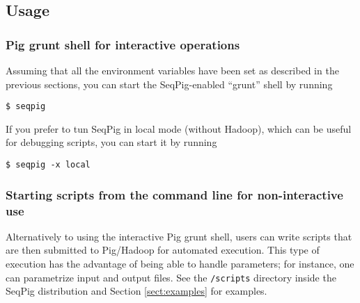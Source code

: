 \subsection{Usage}

\subsubsection{Pig grunt shell for interactive operations}
Assuming that all the environment variables have been set as described in the
previous sections, you can start the SeqPig-enabled ``grunt'' shell by running
%
\begin{lstlisting}
$ seqpig
\end{lstlisting}
%
If you prefer to tun SeqPig in local mode (without Hadoop), which can be useful
for debugging scripts, you can start it by running
%
\begin{lstlisting}
$ seqpig -x local
\end{lstlisting}
%
\subsubsection{Starting scripts from the command line for non-interactive use}
Alternatively to using the interactive Pig grunt shell, users can write scripts
that are then submitted to Pig/Hadoop for automated execution. This type of
execution has the advantage of being able to handle parameters; for instance,
one can parametrize input and output files. See the {\tt /scripts} directory
inside the SeqPig distribution and Section \ref{sect:examples} for examples.
